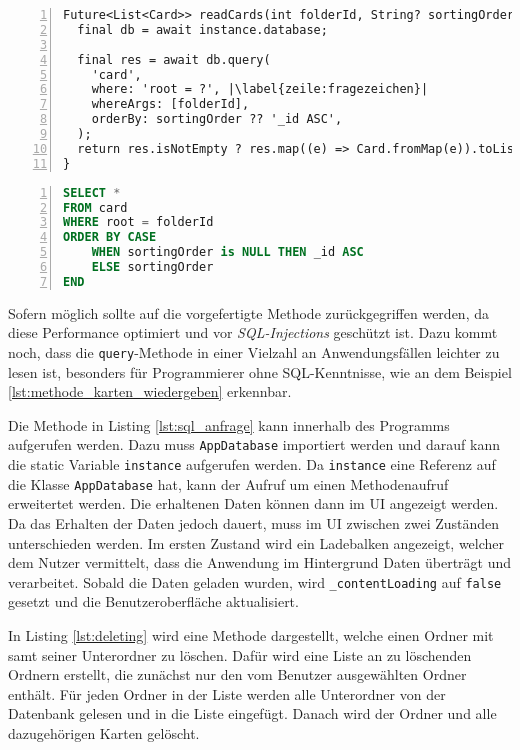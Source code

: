 \begin{lstlisting}[caption={Methode, welche alle Karten eines Ordners wiedergibt},captionpos=b,label={lst:methode_karten_wiedergeben},numbers=left,frame=none,escapechar=|]
Future<List<Card>> readCards(int folderId, String? sortingOrder) async {
  final db = await instance.database;

  final res = await db.query(
    'card',
    where: 'root = ?', |\label{zeile:fragezeichen}|
    whereArgs: [folderId],
    orderBy: sortingOrder ?? '_id ASC',
  );
  return res.isNotEmpty ? res.map((e) => Card.fromMap(e)).toList() : [];
}
\end{lstlisting}

\begin{lstlisting}[caption={Anfrage aus Listing \ref{lst:methode_karten_wiedergeben} als herkömmliche SQL-Anfrage},language=sql,captionpos=b,label={lst:sql_anfrage},numbers=left,frame=none,escapechar=|]
SELECT *
FROM card
WHERE root = folderId
ORDER BY CASE 
    WHEN sortingOrder is NULL THEN _id ASC 
    ELSE sortingOrder
END
\end{lstlisting}

Sofern möglich sollte auf die vorgefertigte Methode zurückgegriffen werden, da diese Performance optimiert und vor \textit{SQL-Injections} geschützt ist. Dazu kommt noch, dass die \texttt{query}-Methode in einer Vielzahl an Anwendungsfällen leichter zu lesen ist, besonders für Programmierer ohne SQL-Kenntnisse, wie an dem Beispiel \ref{lst:methode_karten_wiedergeben} erkennbar.

Die Methode in Listing \ref{lst:sql_anfrage} kann innerhalb des Programms aufgerufen werden. Dazu muss \texttt{AppDatabase} importiert werden und darauf kann die static Variable \texttt{instance} aufgerufen werden. Da \texttt{instance} eine Referenz auf die Klasse \texttt{AppDatabase} hat, kann der Aufruf um einen Methodenaufruf erweitertet werden. Die erhaltenen Daten können dann im UI angezeigt werden. Da das Erhalten der Daten jedoch dauert, muss im UI zwischen zwei Zuständen unterschieden werden. Im ersten Zustand wird ein Ladebalken angezeigt, welcher dem Nutzer vermittelt, dass die Anwendung im Hintergrund Daten überträgt und verarbeitet. Sobald die Daten geladen wurden, wird \texttt{\_contentLoading} auf \texttt{false} gesetzt und die Benutzeroberfläche aktualisiert. 

In Listing \ref{lst:deleting} wird eine Methode dargestellt, welche einen Ordner mit samt seiner Unterordner zu löschen. Dafür wird eine Liste an zu löschenden Ordnern erstellt, die zunächst nur den vom Benutzer ausgewählten Ordner enthält. Für jeden Ordner in der Liste werden alle Unterordner von der Datenbank gelesen und in die Liste eingefügt. Danach wird der Ordner und alle dazugehörigen Karten gelöscht.

